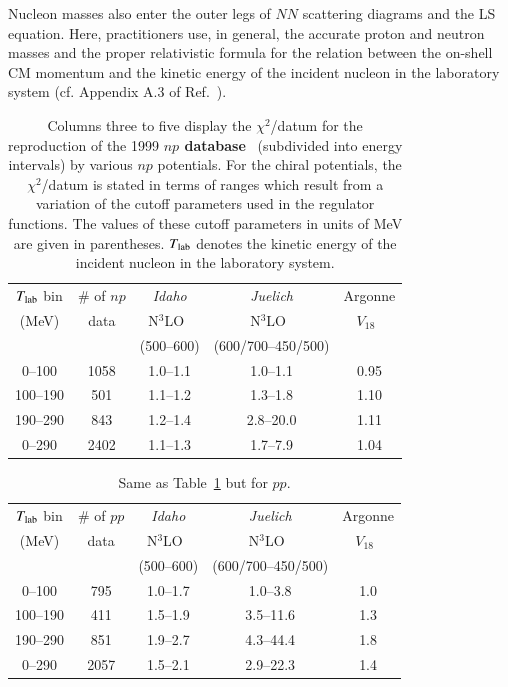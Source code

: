 \documentclass[sort&compress,preprint,3p]{elsarticle}
\begin{document}
Nucleon masses also enter the outer legs of $NN$ scattering diagrams
and the LS equation. Here, practitioners use, in general, the accurate proton and
neutron masses and  the proper relativistic formula
for the relation between the on-shell CM momentum and the kinetic energy 
of the incident nucleon in the laboratory system
(cf. Appendix A.3 of Ref.~\cite{Mac01}). 


\begin{table}[t]
\caption{Columns three to five display the
$\chi^2$/datum for the reproduction of the 1999 
{\boldmath\bf $np$ database}~\cite{note2}
(subdivided into energy intervals)
by various $np$ potentials.
For the chiral potentials, 
the $\chi^2$/datum is stated in terms of ranges
which result from a variation of the cutoff parameters
used in the regulator functions.
The values of these cutoff parameters 
in units of MeV
are given in parentheses.
$T_{\rm lab}$ denotes the kinetic energy of the incident nucleon
in the laboratory system.
\label{tab_chi2b}}
\smallskip
\begin{tabular*}{\textwidth}{@{\extracolsep{\fill}}ccccc}
\hline 
\hline 
\noalign{\smallskip}
 $T_{\rm lab}$ bin
 & \# of {\boldmath $np$}
 & {\it Idaho}
 & {\it Juelich}
 & Argonne         
\\
 (MeV)
 & data
 & N$^3$LO~\cite{EM03}
 & N$^3$LO~\cite{EGM05} 
 & $V_{18}$~\cite{WSS95}
\\
 & 
 & (500--600)
 & (600/700--450/500)
 & 
\\
\hline 
\hline 
\noalign{\smallskip}
0--100&1058&1.0--1.1&1.0--1.1&0.95\\ 
100--190&501&1.1--1.2&1.3--1.8&1.10\\ 
190--290&843&1.2--1.4&2.8--20.0&1.11\\ 
\hline 
\noalign{\smallskip}
0--290&2402&1.1--1.3&1.7--7.9&1.04
\\ 
\hline 
\hline 
\end{tabular*}
\end{table}


\begin{table}[b]
\caption{Same as Table~\ref{tab_chi2b} but for 
{\boldmath\bf $pp$}.
\label{tab_chi2c}}
\smallskip
\begin{tabular*}{\textwidth}{@{\extracolsep{\fill}}ccccc}
\hline 
\hline 
\noalign{\smallskip}
 $T_{\rm lab}$ bin
 & \# of {\boldmath $pp$}
 & {\it Idaho}
 & {\it Juelich}
 & Argonne         
\\
 (MeV)
 & data
 & N$^3$LO~\cite{EM03}
 & N$^3$LO~\cite{EGM05} 
 & $V_{18}$~\cite{WSS95}
\\
 &  
 & (500--600)
 & (600/700--450/500)
 & 
\\
\hline 
\hline 
\noalign{\smallskip}
0--100&795&1.0--1.7&1.0--3.8&1.0 \\ 
100--190&411&1.5--1.9&3.5--11.6&1.3 \\ 
190--290&851&1.9--2.7&4.3--44.4&1.8 \\ 
\hline 
\noalign{\smallskip}
0--290&2057&1.5--2.1&2.9--22.3&1.4 
\\ 
\hline 
\hline 
\end{tabular*}
\end{table}
\end{document}
